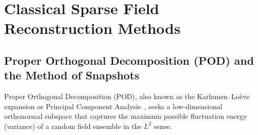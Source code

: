 \section{Classical Sparse Field Reconstruction Methods}
\label{sec:bg_classical}

\subsection{Proper Orthogonal Decomposition (POD) and the Method of Snapshots}
\label{subsec:bg_pod}

Proper Orthogonal Decomposition (POD), also known as the Karhunen--Lo\`eve expansion or Principal Component Analysis~\cite{lumley1967structure, sirovich1987turbulence, berkooz1993proper}, seeks a low-dimensional orthonormal subspace that captures the maximum possible fluctuation energy (variance) of a random field ensemble in the $L^2$ sense.

